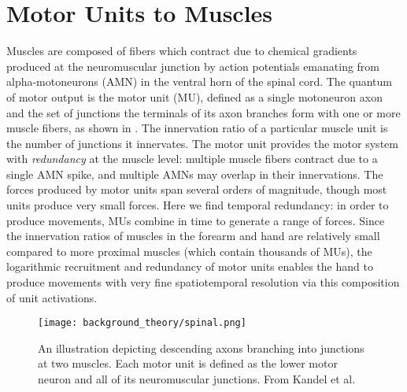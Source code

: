 \documentclass[../main.tex]{subfiles}
\begin{document}
\section{Motor Units to Muscles}\label{motor-units-to-muscles}

Muscles are composed of fibers which contract due to chemical gradients produced at the neuromuscular junction by action potentials emanating from alpha-motoneurons (AMN) in the ventral horn of the spinal cord. The quantum of motor output is the motor unit (MU), defined as a single motoneuron axon and the set of junctions the terminals of its axon branches form with one or more muscle fibers, as shown in . The innervation ratio of a particular muscle unit is the number of junctions it innervates. The motor unit provides the motor system with \textit{redundancy} at the muscle level: multiple muscle fibers contract due to a single AMN spike, and multiple AMNs may overlap in their innervations. The forces produced by motor units span several orders of magnitude, though most units produce very small forces. Here we find temporal redundancy: in order to produce movements, MUs combine in time to generate a range of forces\cite{fuglevandMechanicalPropertiesNeural2011}. Since the innervation ratios of muscles in the forearm and hand are relatively small compared to more proximal muscles (which contain thousands of MUs), the logarithmic recruitment and redundancy of motor units enables the hand to produce movements with very fine spatiotemporal resolution via this composition of unit activations.

\begin{figure}[!htb]
  \centering
  \texttt{[image: background\_theory/spinal.png]}
  \caption[Illustration of lower motor system]{An illustration depicting descending axons branching into junctions at two muscles. Each motor unit is defined as the lower motor neuron and all of its neuromuscular junctions. From Kandel et al.\cite{kandelPrinciplesNeuralScience2013}}\label{fig:motor_units}
\end{figure}

\end{document}
